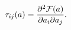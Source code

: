 \begin{equation}
\tau _{ij}(a)=\frac{\partial ^{2}{\cal F}(a)}{\partial a_{i}\partial a_{j}}.
\label{prep}
\end{equation}

